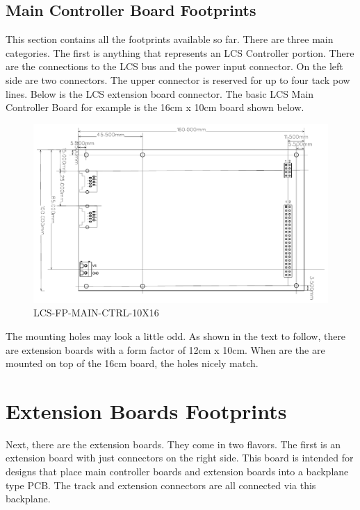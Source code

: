 \subsection{Main Controller Board Footprints}

This section contains all the footprints available so far. There are three main categories. The first is anything that represents an LCS Controller portion. There are the connections to the LCS bus and the power input connector. On the left side are two connectors. The upper connector is reserved for up to four tack pow lines. Below is the LCS extension board connector. The basic LCS Main Controller Board for example is the 16cm x 10cm board shown below.

\begin{figure}[htbp]
    \centering
    \includegraphics[page=1, scale=0.7]{./figures/LCS-FP-MAIN-CTRL-10X16.pdf}
    \caption{LCS-FP-MAIN-CTRL-10X16}
\end{figure}

\FloatBarrier

The mounting holes may look a little odd. As shown in the text to follow, there are extension boards with a form factor of 12cm x 10cm. When are the are mounted on top of the 16cm board, the holes nicely match. 

\section{Extension Boards Footprints}

Next, there are the extension boards. They come in two flavors. The first is an extension board with just connectors on the right side. 
This board is intended for designs that place main controller boards and extension boards into a backplane type PCB. The track and extension connectors are all connected via this backplane.

